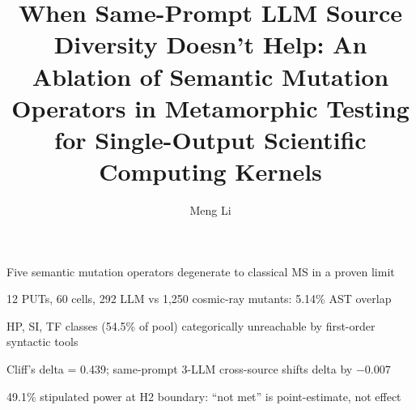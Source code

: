 \documentclass[review,12pt,authoryear]{elsarticle}
\begin{document}
\begin{frontmatter}

\title{When Same-Prompt LLM Source Diversity Doesn't Help: An Ablation of Semantic Mutation Operators in Metamorphic Testing for Single-Output Scientific Computing Kernels}

\author[a]{Meng Li}


\begin{highlights}
\item Five semantic mutation operators degenerate to classical MS in a proven limit
\item 12 PUTs, 60 cells, 292 LLM vs 1,250 cosmic-ray mutants: 5.14\% AST overlap
\item HP, SI, TF classes (54.5\% of pool) categorically unreachable by first-order syntactic tools
\item Cliff's delta = 0.439; same-prompt 3-LLM cross-source shifts delta by $-0.007$
\item 49.1\% stipulated power at H2 boundary: ``not met'' is point-estimate, not effect
\end{highlights}


\end{frontmatter}
\end{document}
